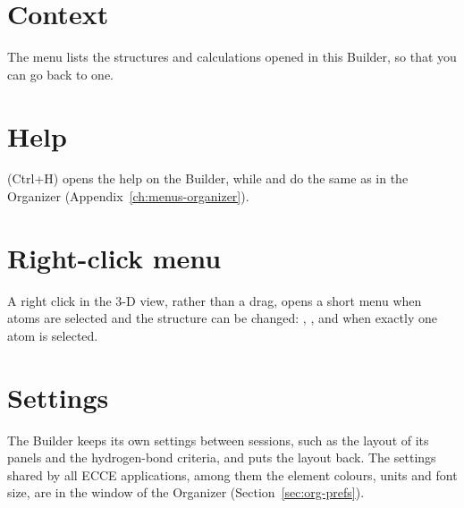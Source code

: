 \section{Context}
The  menu lists the structures and calculations opened in this Builder, so that you can go back to one.

\section{Help}
 (\textsf{Ctrl+H}) opens the help on the Builder, while  and  do the same as in the Organizer (Appendix~\ref{ch:menus-organizer}).

\section{Right-click menu}
A right click in the 3-D view, rather than a drag, opens a short menu when atoms are selected and the structure can be changed: , , and  when exactly one atom is selected.

\section{Settings}
The Builder keeps its own settings between sessions, such as the layout of its panels and the hydrogen-bond criteria, and  puts the layout back. The settings shared by all ECCE applications, among them the element colours, units and font size, are in the  window of the Organizer (Section~\ref{sec:org-prefs}).
